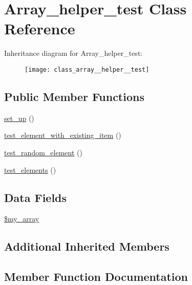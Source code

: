 \hypertarget{class_array__helper__test}{}\section{Array\+\_\+helper\+\_\+test Class Reference}
\label{class_array__helper__test}
Inheritance diagram for Array\+\_\+helper\+\_\+test\+:\begin{figure}[H]
\begin{center}
\leavevmode
\texttt{[image: class\_array\_\_helper\_\_test]}
\end{center}
\end{figure}
\subsection*{Public Member Functions}
\begin{DoxyCompactItemize}
\item 
\hyperlink{class_array__helper__test_a69829875c8d4b6ce94908445c4155741}{set\+\_\+up} ()
\item 
\hyperlink{class_array__helper__test_af33d33598c3f4d5fd4c2d52fd725ca6a}{test\+\_\+element\+\_\+with\+\_\+existing\+\_\+item} ()
\item 
\hyperlink{class_array__helper__test_a94dbb9872f3ae0a9dd95ced6cd41c25a}{test\+\_\+random\+\_\+element} ()
\item 
\hyperlink{class_array__helper__test_a96834048e067eabf3dbf9680b285bfa4}{test\+\_\+elements} ()
\end{DoxyCompactItemize}
\subsection*{Data Fields}
\begin{DoxyCompactItemize}
\item 
\hyperlink{class_array__helper__test_afb14849b6d5ca8632071134e123af8d9}{\$my\+\_\+array}
\end{DoxyCompactItemize}
\subsection*{Additional Inherited Members}


\subsection{Member Function Documentation}
\hypertarget{class_array__helper__test_a69829875c8d4b6ce94908445c4155741}{}
